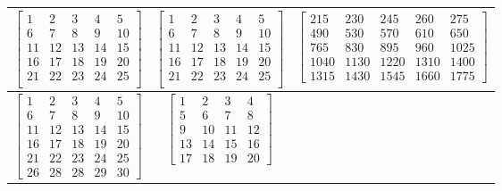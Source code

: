 \begin{table}[H]
\begin{tabular}{|p{4.5cm}|p{4.5cm}|p{6.8cm}|}
\begin{equation*}
\begin{bmatrix}
1 & 2 & 3 & 4 & 5 \\
6 & 7 & 8 & 9 & 10 \\
11 & 12 & 13 & 14 & 15 \\
16 & 17 & 18 & 19 & 20 \\
21 & 22 & 23 & 24 & 25 \\
\end{bmatrix}
\end{equation*}
&
\begin{equation*}
\begin{bmatrix}
1 & 2 & 3 & 4 & 5 \\
6 & 7 & 8 & 9 & 10 \\
11 & 12 & 13 & 14 & 15 \\
16 & 17 & 18 & 19 & 20 \\
21 & 22 & 23 & 24 & 25 \\
\end{bmatrix}
\end{equation*} 
& 
\begin{equation*}
\begin{bmatrix}
215 & 230 & 245 & 260 & 275 \\
490 & 530 & 570 & 610 & 650 \\
765 & 830 & 895 & 960 & 1025 \\
1040 & 1130 & 1220 & 1310 & 1400 \\
1315 & 1430 & 1545 & 1660 & 1775
\end{bmatrix}
\end{equation*} \tabularnewline
\hline
\begin{equation*}
\begin{bmatrix}
1 & 2 & 3 & 4 & 5 \\
6 & 7 & 8 & 9 & 10 \\
11 & 12 & 13 & 14 & 15 \\
16 & 17 & 18 & 19 & 20 \\
21 & 22 & 23 & 24 & 25 \\
26 & 28 & 28 & 29 & 30
\end{bmatrix}
\end{equation*}
&
\begin{equation*}
\begin{bmatrix}
1 & 2 & 3 & 4 \\
5 & 6 & 7 & 8 \\
9 & 10 & 11 & 12 \\
13 & 14 & 15 & 16 \\
17 & 18 & 19 & 20
\end{bmatrix}
\end{equation*} 

\end{tabular}
\end{table}

